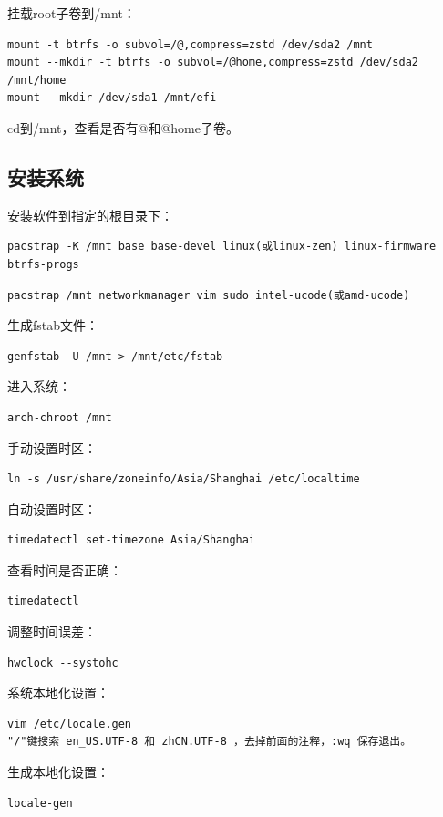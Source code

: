 \documentclass[a4paper, twocolumn, twoside, 10pt]{article}
\begin{document}
挂载root子卷到/mnt：
\begin{lstlisting}
mount -t btrfs -o subvol=/@,compress=zstd /dev/sda2 /mnt
mount --mkdir -t btrfs -o subvol=/@home,compress=zstd /dev/sda2 /mnt/home
mount --mkdir /dev/sda1 /mnt/efi
\end{lstlisting}

cd到/mnt，查看是否有@和@home子卷。

\subsection{安装系统}

安装软件到指定的根目录下：
\begin{lstlisting}
pacstrap -K /mnt base base-devel linux(或linux-zen) linux-firmware btrfs-progs
\end{lstlisting}
\begin{lstlisting}
pacstrap /mnt networkmanager vim sudo intel-ucode(或amd-ucode)
\end{lstlisting}

生成fstab文件：
\begin{lstlisting}
genfstab -U /mnt > /mnt/etc/fstab
\end{lstlisting}

进入系统：
\begin{lstlisting}
arch-chroot /mnt
\end{lstlisting}

手动设置时区：
\begin{lstlisting}
ln -s /usr/share/zoneinfo/Asia/Shanghai /etc/localtime 
\end{lstlisting}

自动设置时区：
\begin{lstlisting}
timedatectl set-timezone Asia/Shanghai
\end{lstlisting}

查看时间是否正确：
\begin{lstlisting}
timedatectl
\end{lstlisting}

调整时间误差：
\begin{lstlisting}
hwclock --systohc
\end{lstlisting}

系统本地化设置：
\begin{lstlisting}
vim /etc/locale.gen 
"/"键搜索 en_US.UTF-8 和 zhCN.UTF-8 ，去掉前面的注释，:wq 保存退出。
\end{lstlisting}

生成本地化设置：
\begin{lstlisting}
locale-gen
\end{lstlisting}
\end{document}
